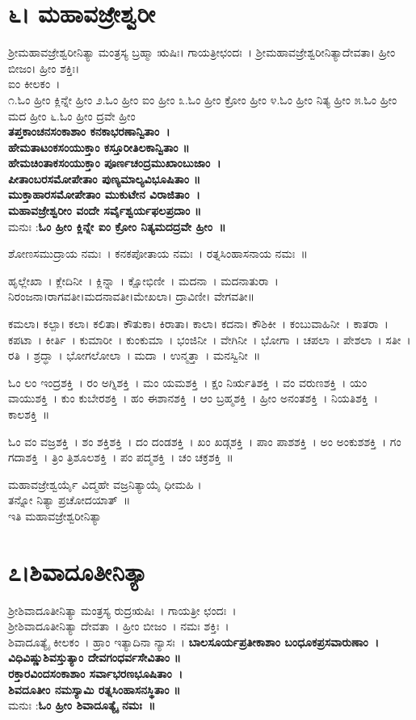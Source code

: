 \section{೬। ಮಹಾವಜ್ರೇಶ್ವರೀ}
ಶ್ರೀಮಹಾವಜ್ರೇಶ್ವರೀನಿತ್ಯಾ ಮಂತ್ರಸ್ಯ ಬ್ರಹ್ಮಾ ಋಷಿಃ। ಗಾಯತ್ರೀಛಂದಃ~। ಶ್ರೀಮಹಾವಜ್ರೇಶ್ವರೀನಿತ್ಯಾದೇವತಾ। ಹ್ರೀಂ ಬೀಜಂ। ಹ್ರೀಂ ಶಕ್ತಿಃ।\\
ಐಂ ಕೀಲಕಂ~।\\
೧.ಓಂ ಹ್ರೀಂ ಕ್ಲಿನ್ನೇ ಹ್ರೀಂ  ೨.ಓಂ ಹ್ರೀಂ ಐಂ ಹ್ರೀಂ  ೩.ಓಂ ಹ್ರೀಂ ಕ್ರೋಂ ಹ್ರೀಂ ೪.ಓಂ ಹ್ರೀಂ ನಿತ್ಯ ಹ್ರೀಂ  ೫.ಓಂ ಹ್ರೀಂ ಮದ ಹ್ರೀಂ ೬.ಓಂ ಹ್ರೀಂ ದ್ರವೇ ಹ್ರೀಂ \\
{\bfseries ತಪ್ತಕಾಂಚನಸಂಕಾಶಾಂ ಕನಕಾಭರಣಾನ್ವಿತಾಂ~।\\
ಹೇಮತಾಟಂಕಸಂಯುಕ್ತಾಂ ಕಸ್ತೂರೀತಿಲಕಾನ್ವಿತಾಂ ॥\\
ಹೇಮಚಿಂತಾಕಸಂಯುಕ್ತಾಂ ಪೂರ್ಣಚಂದ್ರಮುಖಾಂಬುಜಾಂ~।\\
ಪೀತಾಂಬರಸಮೋಪೇತಾಂ ಪುಣ್ಯಮಾಲ್ಯವಿಭೂಷಿತಾಂ ॥\\
ಮುಕ್ತಾಹಾರಸಮೋಪೇತಾಂ ಮುಕುಟೇನ ವಿರಾಜಿತಾಂ~।\\
ಮಹಾವಜ್ರೇಶ್ವರೀಂ ವಂದೇ ಸರ್ವೈಶ್ವರ್ಯಫಲಪ್ರದಾಂ ॥\\}
ಮನುಃ :{\bfseries  ಓಂ ಹ್ರೀಂ ಕ್ಲಿನ್ನೇ ಐಂ ಕ್ರೋಂ ನಿತ್ಯಮದದ್ರವೇ ಹ್ರೀಂ~॥}

ಶೋಣಸಮುದ್ರಾಯ ನಮಃ~। ಕನಕಪೋತಾಯ ನಮಃ~। ರತ್ನಸಿಂಹಾಸನಾಯ ನಮಃ~॥

ಹೃಲ್ಲೇಖಾ~। ಕ್ಲೇದಿನೀ~। ಕ್ಲಿನ್ನಾ~। ಕ್ಷೋಭಿಣೀ~। ಮದನಾ~। ಮದನಾತುರಾ~। \\ನಿರಂಜನಾ।ರಾಗವತೀ।ಮದನಾವತೀ।ಮೇಖಲಾ। ದ್ರಾವಿಣೀ। ವೇಗವತೀ॥ 

ಕಮಲಾ। ಕಲ್ಪಾ। ಕಲಾ। ಕಲಿತಾ। ಕೌತುಕಾ। ಕಿರಾತಾ। ಕಾಲಾ। ಕದನಾ। ಕೌಶಿಕೀ~। ಕಂಬುವಾಹಿನೀ~। ಕಾತರಾ~। ಕಪಟಾ~। ಕೀರ್ತಿ~। ಕುಮಾರೀ~। ಕುಂಕುಮಾ~। ಭಂಜಿನೀ~। ವೇಗಿನೀ~। ಭೋಗಾ~। ಚಪಲಾ~। ಪೇಶಲಾ~। ಸತೀ~। ರತಿ~। ಶ್ರದ್ಧಾ~। ಭೋಗಲೋಲಾ~। ಮದಾ~। ಉನ್ಮತ್ತಾ~। ಮನಸ್ವಿನೀ~॥ 

ಓಂ ಲಂ ಇಂದ್ರಶಕ್ತಿ~।  ರಂ ಅಗ್ನಿಶಕ್ತಿ~।  ಮಂ ಯಮಶಕ್ತಿ~।  ಕ್ಷಂ ನಿರ್ಋತಿಶಕ್ತಿ~।  ವಂ ವರುಣಶಕ್ತಿ~।  ಯಂ ವಾಯುಶಕ್ತಿ~।  ಕುಂ ಕುಬೇರಶಕ್ತಿ~।  ಹಂ ಈಶಾನಶಕ್ತಿ~।  ಆಂ ಬ್ರಹ್ಮಶಕ್ತಿ~।  ಹ್ರೀಂ ಅನಂತಶಕ್ತಿ~।  ನಿಯತಿಶಕ್ತಿ~।  ಕಾಲಶಕ್ತಿ~॥

ಓಂ ವಂ ವಜ್ರಶಕ್ತಿ~।  ಶಂ ಶಕ್ತಿಶಕ್ತಿ~।  ದಂ ದಂಡಶಕ್ತಿ~।  ಖಂ ಖಡ್ಗಶಕ್ತಿ~।  ಪಾಂ ಪಾಶಶಕ್ತಿ~।  ಅಂ ಅಂಕುಶಶಕ್ತಿ~।  ಗಂ ಗದಾಶಕ್ತಿ~।  ತ್ರಿಂ ತ್ರಿಶೂಲಶಕ್ತಿ~।  ಪಂ ಪದ್ಮಶಕ್ತಿ~।  ಚಂ ಚಕ್ರಶಕ್ತಿ~॥

ಮಹಾವಜ್ರೇಶ್ವರ್ಯೈ ವಿದ್ಮಹೇ ವಜ್ರನಿತ್ಯಾಯೈ ಧೀಮಹಿ ।\\ತನ್ನೋ ನಿತ್ಯಾ ಪ್ರಚೋದಯಾತ್~॥\\
ಇತಿ ಮಹಾವಜ್ರೇಶ್ವರೀನಿತ್ಯಾ
\section{೭।ಶಿವಾದೂತೀನಿತ್ಯಾ}
ಶ್ರೀಶಿವಾದೂತೀನಿತ್ಯಾ ಮಂತ್ರಸ್ಯ ರುದ್ರಋಷಿಃ~। ಗಾಯತ್ರೀ ಛಂದಃ~।\\ ಶ್ರೀಶಿವಾದೂತೀನಿತ್ಯಾ ದೇವತಾ~। ಹ್ರೀಂ ಬೀಜಂ~। ನಮಃ ಶಕ್ತಿಃ~।\\ ಶಿವಾದೂತ್ಯೈ ಕೀಲಕಂ~। ಹ್ರಾಂ ಇತ್ಯಾದಿನಾ ನ್ಯಾಸಃ~।
{\bfseries ಬಾಲಸೂರ್ಯಪ್ರತೀಕಾಶಾಂ ಬಂಧೂಕಪ್ರಸವಾರುಣಾಂ~।\\
ವಿಧಿವಿಷ್ಣುಶಿವಸ್ತುತ್ಯಾಂ ದೇವಗಂಧರ್ವಸೇವಿತಾಂ ॥\\
ರಕ್ತಾರವಿಂದಸಂಕಾಶಾಂ ಸರ್ವಾಭರಣಭೂಷಿತಾಂ~।\\
ಶಿವದೂತೀಂ ನಮಸ್ಯಾಮಿ ರತ್ನಸಿಂಹಾಸನಸ್ಥಿತಾಂ ॥\\}
ಮನುಃ :{\bfseries  ಓಂ ಹ್ರೀಂ ಶಿವಾದೂತ್ಯೈ ನಮಃ~॥}

